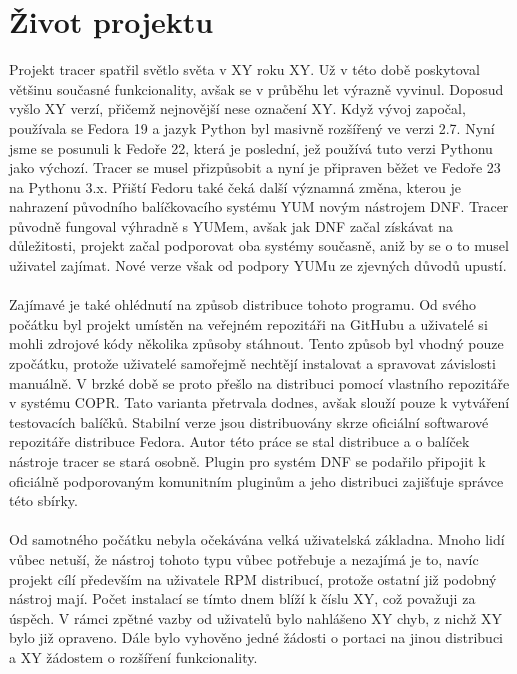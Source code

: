 \documentclass[
  field=inf,
  biblatex,
  glossaries,
  index
]{kidiplom}
\begin{document}
\section{Život projektu}
Projekt tracer spatřil světlo světa v XY roku XY. Už v této době poskytoval většinu současné funkcionality, avšak se v průběhu let výrazně vyvinul. Doposud vyšlo XY verzí, přičemž nejnovější nese označení XY. Když vývoj započal, používala se Fedora 19 a jazyk Python byl masivně rozšířený ve verzi 2.7. Nyní jsme se posunuli k Fedoře 22, která je poslední, jež používá tuto verzi Pythonu jako výchozí. Tracer se musel přizpůsobit a nyní je připraven běžet ve Fedoře 23 na Pythonu 3.x. Přiští Fedoru také čeká další významná změna, kterou je nahrazení původního balíčkovacího systému YUM novým nástrojem DNF. Tracer původně fungoval výhradně s YUMem, avšak jak DNF začal získávat na důležitosti, projekt začal podporovat oba systémy současně, aniž by se o to musel uživatel zajímat. Nové verze však od podpory YUMu ze zjevných důvodů upustí.
\\
\\
Zajímavé je také ohlédnutí na způsob distribuce tohoto programu. Od svého počátku byl projekt umístěn na veřejném repozitáři na GitHubu a uživatelé si mohli zdrojové kódy několika způsoby stáhnout. Tento způsob byl vhodný pouze zpočátku, protože uživatelé samořejmě nechtějí instalovat a spravovat závislosti manuálně. V brzké době se proto přešlo na distribuci pomocí vlastního repozitáře v systému COPR. Tato varianta přetrvala dodnes, avšak slouží pouze k vytváření testovacích balíčků. Stabilní verze jsou distribuovány skrze oficiální softwarové repozitáře distribuce Fedora. Autor této práce se stal  distribuce a o balíček nástroje tracer se stará osobně. Plugin pro systém DNF se podařilo připojit k oficiálně podporovaným komunitním pluginům a jeho distribuci zajišťuje správce této sbírky.
\\
\\
Od samotného počátku nebyla očekávána velká uživatelská základna. Mnoho lidí vůbec netuší, že nástroj tohoto typu vůbec potřebuje a nezajímá je to, navíc projekt cílí především na uživatele RPM distribucí, protože ostatní již podobný nástroj mají. Počet instalací se tímto dnem blíží k číslu XY, což považuji za úspěch. V rámci zpětné vazby od uživatelů bylo nahlášeno XY chyb, z nichž XY bylo již opraveno. Dále bylo vyhověno jedné žádosti o portaci na jinou distribuci a XY žádostem o rozšíření funkcionality.
\end{document}

